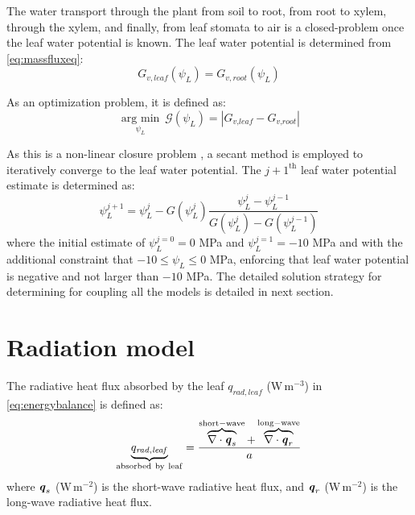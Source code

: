 The water transport through the plant from soil to root, from root to xylem, through the xylem, and finally, from leaf stomata to air is a closed-problem once the leaf water potential is known. The leaf water potential is determined from \cref{eq:massfluxeq}:
\begin{equation}
G_{v,leaf}(\psi_L) = G_{v,root} (\psi_L)
\end{equation}

As an optimization problem, it is defined as:
\begin{equation}
\mathop {\mathrm{arg\ min} }\limits_{\psi_L}~\mathcal{G}(\psi _L) = \left| {{G_{\textit{v,leaf}}} - {G_{\textit{v,root}}}} \right|
\end{equation}

As this is a non-linear closure problem \citep{Manoli2014},  a secant method is employed to iteratively converge to the leaf water potential. The $j+1^\mathrm{th}$ leaf water potential estimate is determined as:
\begin{equation}
\psi_L^{j+1} = \psi_L^{j} - G(\psi_L^j) \frac{\psi_L^j - \psi_L^{j-1}}{G\left(\psi_L^j\right) - G\left(\psi_L^{j-1}\right) }
\end{equation}
where the initial estimate of $\psi_L^{j=0} = 0$ MPa and $\psi_L^{j=1} = -10$ MPa and with the additional constraint that $-10 \le \psi_L \le 0$ MPa, enforcing that leaf water potential is negative and not larger than $-10$ MPa. The detailed solution strategy for determining for coupling all the models is detailed in next section.

\section{Radiation model}
\label{sec:radiationmodel}

The radiative heat flux absorbed by the leaf ${q_{\mathit{rad,leaf}}}$ (W\,m$^{-3}$) in \cref{eq:energybalance} is defined as:
\begin{equation}
\underbrace{q_{\mathit{rad,leaf}}}_{\mathrm{absorbed\ by\ leaf}} = \frac {\overbrace{\nabla  \cdot \mvec{q}_s}^{\mathrm{short-wave}} + \overbrace{\nabla  \cdot \mvec{q}_r}^{\mathrm{long-wave}}}{a}
\label{eq:qradleaf2}
\end{equation}
where $\textbf{\textit{q}}_s$ (W\,m$^{-2}$) is the short-wave radiative heat flux, and $\textbf{\textit{q}}_r$ (W\,m$^{-2}$) is the long-wave radiative heat flux. 

